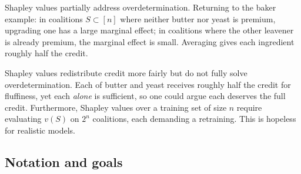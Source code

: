 Shapley values partially address overdetermination. Returning to the baker example: in coalitions $S\subset [n]$ where neither butter nor yeast is premium, upgrading one has a large marginal effect; in coalitions where the other leavener is already premium, the marginal effect is small. Averaging gives each ingredient roughly half the credit.


%

\begin{remark}\label{rem:shapley-limit}
  Shapley values redistribute credit more fairly but do not fully solve overdetermination. Each of butter and yeast receives roughly half the credit for fluffiness, yet each \emph{alone} is sufficient, so one could argue each deserves the full credit. Furthermore, Shapley values over a training set of size $n$ require evaluating $v(S)$ on $2^n$ coalitions, each demanding a retraining. This is hopeless for realistic models. 
\end{remark}

\subsection{Notation and goals}\label{subsec:convention}

